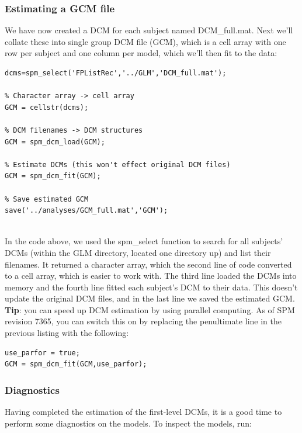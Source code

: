 \documentclass{article}
\begin{document}
\subsubsection{Estimating a GCM file}

We have now created a DCM for each subject named DCM\_full.mat. Next we'll collate these into single group DCM file (GCM), which is a cell array with one row per subject and one column per model, which we'll then fit to the data:

\begin{lstlisting}[style=Matlab-editor, caption=Estimating models]
% Find all DCM files
dcms=spm_select('FPListRec','../GLM','DCM_full.mat');

% Character array -> cell array
GCM = cellstr(dcms);
    
% DCM filenames -> DCM structures
GCM = spm_dcm_load(GCM);

% Estimate DCMs (this won't effect original DCM files)
GCM = spm_dcm_fit(GCM);

% Save estimated GCM
save('../analyses/GCM_full.mat','GCM');
    
\end{lstlisting}

In the code above, we used the spm\_select function to search for all subjects' DCMs (within the GLM directory, located one directory up) and list their filenames. It returned a character array, which the second line of code converted to a cell array, which is easier to work with. The third line loaded the DCMs into memory and the fourth line fitted each subject's DCM to their data. This doesn't update the original DCM files, and in the last line we saved the estimated GCM. \\

\textbf{Tip}: you can speed up DCM estimation by using parallel computing. As of SPM revision 7365, you can switch this on by replacing the penultimate line in the previous listing with the following:

\begin{lstlisting}[style=Matlab-editor, caption=Enabling parallel DCM estimation]
use_parfor = true;
GCM = spm_dcm_fit(GCM,use_parfor);

\end{lstlisting}

\subsubsection{Diagnostics}
Having completed the estimation of the first-level DCMs, it is a good time to perform some diagnostics on the models. To inspect the models, run:
\end{document}
